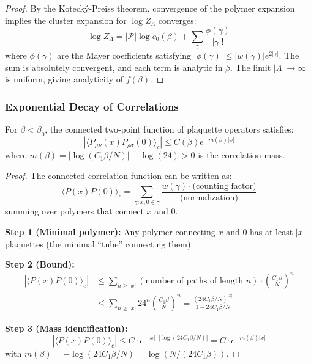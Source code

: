 \begin{proof}
By the Kotecký-Preiss theorem, convergence of the polymer expansion implies the cluster expansion for $\log Z_\Lambda$ converges:
\begin{equation}
\log Z_\Lambda = |\mathcal{P}| \log c_0(\beta) + \sum_{\gamma} \frac{\phi(\gamma)}{|\gamma|!}
\end{equation}
where $\phi(\gamma)$ are the Mayer coefficients satisfying $|\phi(\gamma)| \leq |w(\gamma)| e^{2|\gamma|}$. The sum is absolutely convergent, and each term is analytic in $\beta$. The limit $|\Lambda| \to \infty$ is uniform, giving analyticity of $f(\beta)$.
\end{proof}

\subsubsection{Exponential Decay of Correlations}

\begin{theorem}
\label{thm:strong_coupling_decay}
For $\beta < \beta_0$, the connected two-point function of plaquette operators satisfies:
\begin{equation}
|\langle P_{\mu\nu}(x) P_{\rho\sigma}(0) \rangle_c| \leq C(\beta) e^{-m(\beta)|x|}
\end{equation}
where $m(\beta) = |\log(C_1\beta/N)| - \log(24) > 0$ is the correlation mass.
\end{theorem}

\begin{proof}
The connected correlation function can be written as:
\begin{equation}
\langle P(x) P(0) \rangle_c = \sum_{\gamma : x, 0 \in \gamma} \frac{w(\gamma) \cdot \text{(counting factor)}}{\text{(normalization)}}
\end{equation}
summing over polymers that connect $x$ and $0$.

\textbf{Step 1 (Minimal polymer):}
Any polymer connecting $x$ and $0$ has at least $|x|$ plaquettes (the minimal ``tube'' connecting them).

\textbf{Step 2 (Bound):}
\begin{align}
|\langle P(x) P(0) \rangle_c| &\leq \sum_{n \geq |x|} (\text{number of paths of length } n) \cdot \left(\frac{C_1\beta}{N}\right)^n \\
&\leq \sum_{n \geq |x|} 24^n \left(\frac{C_1\beta}{N}\right)^n = \frac{(24 C_1\beta/N)^{|x|}}{1 - 24C_1\beta/N}
\end{align}

\textbf{Step 3 (Mass identification):}
\begin{equation}
|\langle P(x) P(0) \rangle_c| \leq C \cdot e^{-|x| \cdot |\log(24C_1\beta/N)|} = C \cdot e^{-m(\beta)|x|}
\end{equation}
with $m(\beta) = -\log(24C_1\beta/N) = \log(N/(24C_1\beta))$.
\end{proof}

